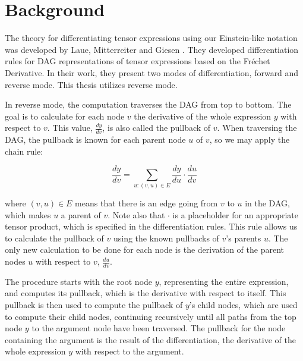 \documentclass[12pt, a4paper]{report}
\begin{document}
\section{Background}
The theory for differentiating tensor expressions using our Einstein-like notation was developed by Laue, Mitterreiter and Giesen \cite{tensorpaper}.
They developed differentiation rules for DAG representations of tensor expressions based on the Fr\'{e}chet Derivative.
In their work, they present two modes of differentiation, forward and reverse mode.
This thesis utilizes reverse mode.

In reverse mode, the computation traverses the DAG from top to bottom.
The goal is to calculate for each node $v$ the derivative of the whole expression $y$ with respect to $v$.
This value, $\frac{dy}{dv}$, is also called the pullback of $v$.
When traversing the DAG, the pullback is known for each parent node $u$ of $v$, so we may apply the chain rule:

\begin{equation}
    \frac{dy}{dv} = \sum_{u: (v,u) \in E} \frac{dy}{du} \cdot \frac{du}{dv}
    \label{eq:diff}
\end{equation}

where $(v,u) \in E$ means that there is an edge going from $v$ to $u$ in the DAG, which makes $u$ a parent of $v$. 
Note also that $\cdot$ is a placeholder for an appropriate tensor product, which is specified in the differentiation rules. 
This rule allows us to calculate the pullback of $v$ using the known pullbacks of $v$'s parents $u$.
The only new calculation to be done for each node is the derivation of the parent nodes $u$ with respect to $v$, $\frac{du}{dv}$.

The procedure starts with the root node $y$, representing the entire expression, and computes its pullback, which is the derivative with respect to itself.
This pullback is then used to compute the pullback of $y$'s child nodes, which are used to compute their child nodes, continuing recursively until all paths from the top node $y$ to the argument node have been traversed.
The pullback for the node containing the argument is the result of the differentiation, the derivative of the whole expression $y$ with respect to the argument.
\end{document}
